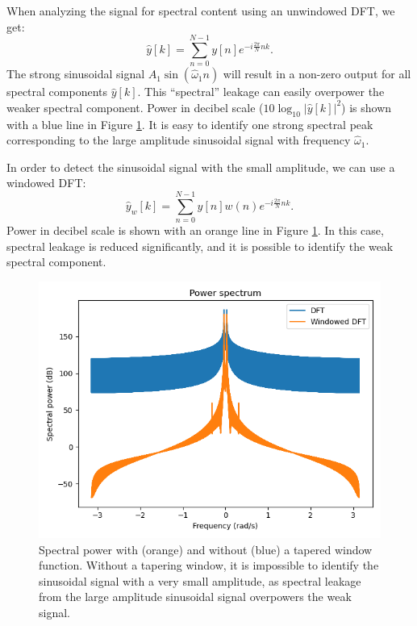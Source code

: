 When analyzing the signal for spectral content using an unwindowed DFT, we get:
\begin{equation}
    \hat{y}[k] = \sum_{n=0}^{N-1} y[n]e^{-i\frac{2\pi}{N}nk}.
\end{equation}
The strong sinusoidal signal $A_1 \sin(\hat{\omega}_1 n)$ will result
in a non-zero output for all spectral components $\hat{y}[k]$. This
``spectral'' leakage can easily overpower the weaker spectral
component. Power in decibel scale ($10 \log_{10}|\hat{y}[k]|^2$) is
shown with a blue line in
Figure \ref{fig:windowed_nonwindowed_spec}. It is easy to identify one
strong spectral peak corresponding to the large amplitude sinusoidal
signal with frequency $\hat{\omega}_1$.

In order to detect the sinusoidal signal with the small amplitude, we can use a windowed DFT:
\begin{equation}
    \hat{y}_w[k] = \sum_{n=0}^{N-1} y[n]w(n)e^{-i\frac{2\pi}{N}nk}.
\end{equation}
Power in decibel scale is shown with an orange line in Figure \ref{fig:windowed_nonwindowed_spec}. In this
case, spectral leakage is reduced significantly, and it is possible to
identify the weak spectral component.

\begin{figure}
    \begin{center}
        \includegraphics[width=\textwidth]{code/022_window_functions/windowed_spec.png}
    \end{center}
    \caption{Spectral power with (orange) and without (blue) a tapered window function. Without a tapering window,
        it is impossible to identify the sinusoidal signal with a very small amplitude, as spectral leakage from
        the large amplitude sinusoidal signal overpowers the weak signal.}
    \label{fig:windowed_nonwindowed_spec}
\end{figure}

